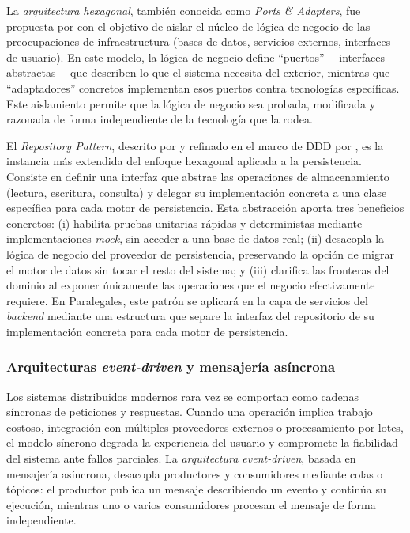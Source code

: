 La \textit{arquitectura hexagonal}, también conocida como \textit{Ports \& Adapters}, fue propuesta por \textcite{Cockburn2005} con el objetivo de aislar el núcleo de lógica de negocio de las preocupaciones de infraestructura (bases de datos, servicios externos, interfaces de usuario). En este modelo, la lógica de negocio define ``puertos'' —interfaces abstractas— que describen lo que el sistema necesita del exterior, mientras que ``adaptadores'' concretos implementan esos puertos contra tecnologías específicas. Este aislamiento permite que la lógica de negocio sea probada, modificada y razonada de forma independiente de la tecnología que la rodea.

El \textit{Repository Pattern}, descrito por \textcite{Fowler2002} y refinado en el marco de DDD por \textcite{Evans2003}, es la instancia más extendida del enfoque hexagonal aplicada a la persistencia. Consiste en definir una interfaz que abstrae las operaciones de almacenamiento (lectura, escritura, consulta) y delegar su implementación concreta a una clase específica para cada motor de persistencia. Esta abstracción aporta tres beneficios concretos: (i) habilita pruebas unitarias rápidas y deterministas mediante implementaciones \textit{mock}, sin acceder a una base de datos real; (ii) desacopla la lógica de negocio del proveedor de persistencia, preservando la opción de migrar el motor de datos sin tocar el resto del sistema; y (iii) clarifica las fronteras del dominio al exponer únicamente las operaciones que el negocio efectivamente requiere. En Paralegales, este patrón se aplicará en la capa de servicios del \textit{backend} mediante una estructura que separe la interfaz del repositorio de su implementación concreta para cada motor de persistencia.

\subsubsection{Arquitecturas \textit{event-driven} y mensajería asíncrona}

Los sistemas distribuidos modernos rara vez se comportan como cadenas síncronas de peticiones y respuestas. Cuando una operación implica trabajo costoso, integración con múltiples proveedores externos o procesamiento por lotes, el modelo síncrono degrada la experiencia del usuario y compromete la fiabilidad del sistema ante fallos parciales. La \textit{arquitectura event-driven}, basada en mensajería asíncrona, desacopla productores y consumidores mediante colas o tópicos: el productor publica un mensaje describiendo un evento y continúa su ejecución, mientras uno o varios consumidores procesan el mensaje de forma independiente.

